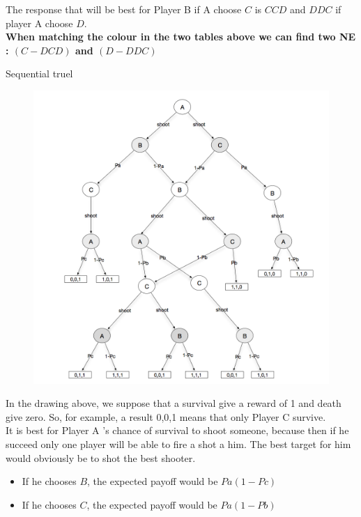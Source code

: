 \documentclass[11pt]{article}
\newenvironment{exercise}[2][Exercise]{\begin{trivlist}
\item[\hskip \labelsep {\bfseries #1}\hskip \labelsep {\bfseries #2.}]}{\end{trivlist}}
\begin{document}
The response that will be best for Player B if A choose $C$ is ${CCD}$ and $DDC$ if player A choose $D$. \\

\textbf{When matching the colour in the two tables above we can find two NE :
$(C - DCD)$ and $(D - DDC)$ }

\begin{exercise}{3} Sequential truel
\end{exercise}

 
\begin{figure}[H]
   \includegraphics[width=\textwidth]{img/exo3.png}
\end{figure}

In the drawing above, we suppose that a survival give a reward of 1 and death give zero. So, for example, a result 0,0,1 means that only Player C survive. \\

It is best for Player A 's chance of survival to shoot someone, because then if he succeed only one player will be able to fire a shot a him. The best target for him would obviously be to shot the best shooter.

\begin{itemize}
	\item If he chooses $B$, the expected payoff would be $Pa (1-Pc)$
	\item If he chooses $C$, the expected payoff would be $Pa (1-Pb)$
\end{itemize}
\end{document}
